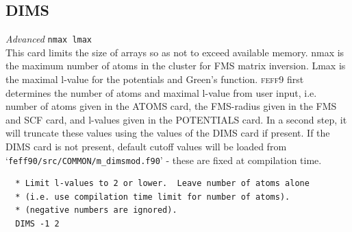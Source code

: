 \documentclass[11pt,oneside]{report} %
\newcommand{\program}[1]{\textsc{#1}}
\newcommand{\feff}{\program{feff}}
\newcommand{\vnum}{9}
\newcommand{\feffcur}{\feff\vnum}
\newenvironment{Card}[4]%
      {\vspace{3ex}%
        \subsection{#1}
        \quad\textsl{#3}\newline
        \quad\texttt{#2}\newline%
        \label{card:#4}\\}
      {}
\newcommand{\file}[1]{`\texttt{#1}'}
\begin{document}
\begin{Card}{DIMS}{nmax lmax}{Advanced}{dim}
  This card limits the size of arrays so as not to exceed available memory.  nmax is the maximum number of atoms in the cluster
  for FMS matrix inversion.  Lmax is the maximal l-value for the potentials and Green's function.
  {\feffcur} first determines the number of atoms and maximal l-value from user input, i.e. number of atoms given in the ATOMS card,
  the FMS-radius given in the FMS and SCF card, and l-values given in the POTENTIALS card.  In a second step, it will truncate these values using the values of the DIMS card if present.  If the DIMS card is not present, default cutoff values will be loaded from 
  \file{feff90/src/COMMON/m\_dimsmod.f90} - these are fixed at compilation time.
\begin{verbatim}
  * Limit l-values to 2 or lower.  Leave number of atoms alone 
  * (i.e. use compilation time limit for number of atoms).
  * (negative numbers are ignored).
  DIMS -1 2
\end{verbatim}
\end{Card}  
\end{document}
